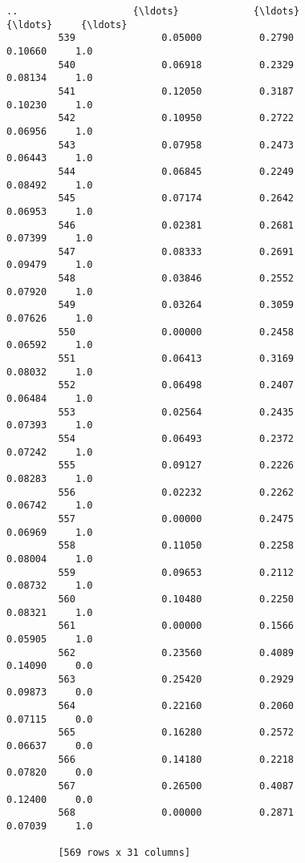 \documentclass[11pt]{article}
\begin{document}
\begin{Verbatim}[commandchars=\\\{\}]
         ..                    {\ldots}             {\ldots}                      {\ldots}     {\ldots}  
         539               0.05000          0.2790                  0.10660     1.0  
         540               0.06918          0.2329                  0.08134     1.0  
         541               0.12050          0.3187                  0.10230     1.0  
         542               0.10950          0.2722                  0.06956     1.0  
         543               0.07958          0.2473                  0.06443     1.0  
         544               0.06845          0.2249                  0.08492     1.0  
         545               0.07174          0.2642                  0.06953     1.0  
         546               0.02381          0.2681                  0.07399     1.0  
         547               0.08333          0.2691                  0.09479     1.0  
         548               0.03846          0.2552                  0.07920     1.0  
         549               0.03264          0.3059                  0.07626     1.0  
         550               0.00000          0.2458                  0.06592     1.0  
         551               0.06413          0.3169                  0.08032     1.0  
         552               0.06498          0.2407                  0.06484     1.0  
         553               0.02564          0.2435                  0.07393     1.0  
         554               0.06493          0.2372                  0.07242     1.0  
         555               0.09127          0.2226                  0.08283     1.0  
         556               0.02232          0.2262                  0.06742     1.0  
         557               0.00000          0.2475                  0.06969     1.0  
         558               0.11050          0.2258                  0.08004     1.0  
         559               0.09653          0.2112                  0.08732     1.0  
         560               0.10480          0.2250                  0.08321     1.0  
         561               0.00000          0.1566                  0.05905     1.0  
         562               0.23560          0.4089                  0.14090     0.0  
         563               0.25420          0.2929                  0.09873     0.0  
         564               0.22160          0.2060                  0.07115     0.0  
         565               0.16280          0.2572                  0.06637     0.0  
         566               0.14180          0.2218                  0.07820     0.0  
         567               0.26500          0.4087                  0.12400     0.0  
         568               0.00000          0.2871                  0.07039     1.0  
         
         [569 rows x 31 columns]
\end{Verbatim}
            
\end{document}
